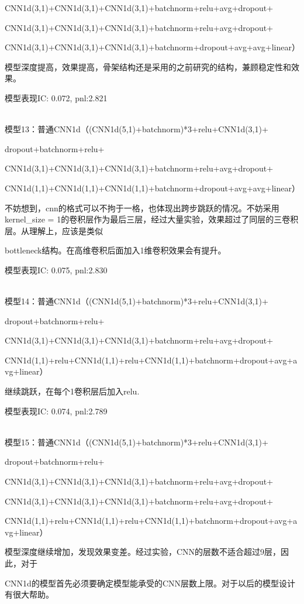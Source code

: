 \documentclass[11pt]{ctexart}
\begin{document}
CNN1d(3,1)+CNN1d(3,1)+CNN1d(3,1)+batchnorm+relu+avg+dropout+

CNN1d(3,1)+CNN1d(3,1)+CNN1d(3,1)+batchnorm+relu+avg+dropout+

CNN1d(3,1)+CNN1d(3,1)+CNN1d(3,1)+batchnorm+dropout+avg+avg+linear）

模型深度提高，效果提高，骨架结构还是采用的之前研究的结构，兼顾稳定性和效果。

模型表现{\kaishu \small IC: 0.072, pnl:2.821}

~\\
模型13：普通CNN1d（(CNN1d(5,1)+batchnorm)*3+relu+CNN1d(3,1)+

dropout+batchnorm+relu+

CNN1d(3,1)+CNN1d(3,1)+CNN1d(3,1)+batchnorm+relu+avg+dropout+

CNN1d(1,1)+CNN1d(1,1)+CNN1d(1,1)+batchnorm+dropout+avg+avg+linear）

不妨想到，cnn的格式可以不拘于一格，也体现出跨步跳跃的情况。不妨采用kernel\_size = 1的卷积层作为最后三层，经过大量实验，效果超过了同层的三卷积层。从理解上，应该是类似\par bottleneck结构。在高维卷积后面加入1维卷积效果会有提升。

模型表现{\kaishu \small IC: 0.075, pnl:2.830}

~\\
模型14：普通CNN1d（(CNN1d(5,1)+batchnorm)*3+relu+CNN1d(3,1)+

dropout+batchnorm+relu+

CNN1d(3,1)+CNN1d(3,1)+CNN1d(3,1)+batchnorm+relu+avg+dropout+

CNN1d(1,1)+relu+CNN1d(1,1)+relu+CNN1d(1,1)+batchnorm+dropout+avg+avg+linear）

继续跳跃，在每个1卷积层后加入relu.

模型表现{\kaishu \small IC: 0.074, pnl:2.789}

~\\
模型15：普通CNN1d（(CNN1d(5,1)+batchnorm)*3+relu+CNN1d(3,1)+

dropout+batchnorm+relu+

CNN1d(3,1)+CNN1d(3,1)+CNN1d(3,1)+batchnorm+relu+avg+dropout+

CNN1d(3,1)+CNN1d(3,1)+CNN1d(3,1)+batchnorm+relu+avg+dropout+

CNN1d(1,1)+relu+CNN1d(1,1)+relu+CNN1d(1,1)+batchnorm+dropout+avg+avg+linear）

模型深度继续增加，发现效果变差。经过实验，CNN的层数不适合超过9层，因此，对于\par CNN1d的模型首先必须要确定模型能承受的CNN层数上限。对于以后的模型设计有很大帮助。
\end{document}

